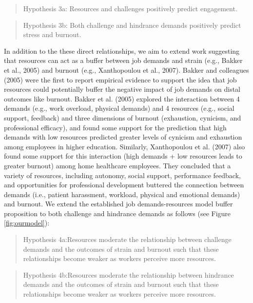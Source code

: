 \documentclass[
  man]{apa7}
\begin{document}
\begin{quote}
Hypothesis 3a: Resources and challenges positively predict engagement.
\end{quote}

\begin{quote}
Hypothesis 3b: Both challenge and hindrance demands positively predict stress and burnout.
\end{quote}

In addition to the these direct relationships, we aim to extend work suggesting that resources can act as a buffer between job demands and strain (e.g., Bakker et al., 2005) and burnout (e.g., Xanthopoulou et al., 2007). Bakker and colleagues (2005) were the first to report empirical evidence to support the idea that job resources could potentially buffer the negative impact of job demands on distal outcomes like burnout. Bakker et al. (2005) explored the interaction between 4 demands (e.g., work overload, physical demands) and 4 resources (e.g., social support, feedback) and three dimensions of burnout (exhaustion, cynicism, and professional efficacy), and found some support for the prediction that high demands with low resources predicted greater levels of cynicism and exhaustion among employees in higher education. Similarly, Xanthopoulou et al. (2007) also found some support for this interaction (high demands + low resources leads to greater burnout) among home healthcare employees. They concluded that a variety of resources, including autonomy, social support, performance feedback, and opportunities for professional development buttered the connection between demands (i.e., patient harassment, workload, physical and emotional demands) and burnout. We extend the established job demands-resources model buffer proposition to both challenge and hindrance demands as follows (see Figure \ref{fig:ourmodel}):

\begin{quote}
Hypothesis 4a:Resources moderate the relationship between challenge demands and the outcomes of strain and burnout such that these relationships become weaker as workers perceive more resources.
\end{quote}

\begin{quote}
Hypothesis 4b:Resources moderate the relationship between hindrance demands and the outcomes of strain and burnout such that these relationships become weaker as workers perceive more resources.
\end{quote}
\end{document}
